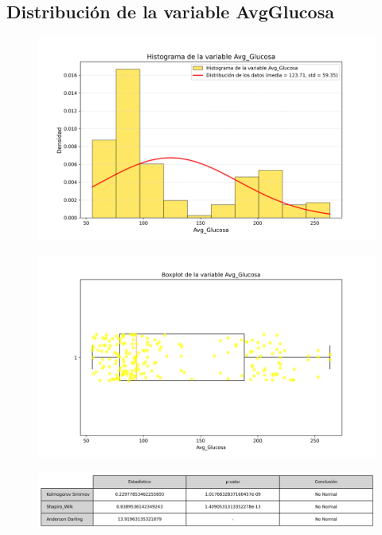 \documentclass[a4paper, 12pt]{article}
\begin{document}
\subsection{Distribución de la variable AvgGlucosa}
\begin{figure}[H]
    \centering
    \includegraphics[width=1\textwidth]{img/Histogramas/Histograma_Avg_Glucosa.png}
\end{figure}

\begin{figure}[H]
    \centering
    \includegraphics[width=1\textwidth]{img/Boxplot/Boxplt_Avg_Glucosa.png}
\end{figure}

\begin{figure}[H]
    \centering
    \includegraphics[width=1\textwidth]{img/Tablas/test_normalidad_Avg_Glucosa.png}
\end{figure}
\end{document}
